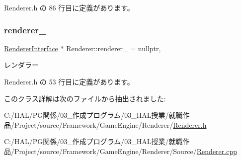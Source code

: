  Renderer.\+h の 86 行目に定義があります。

\mbox{\label{class_renderer_a64d00cd885d84ff355228d884c0215dc}} 
\subsubsection{\texorpdfstring{renderer\+\_\+}{renderer\_}}
{\footnotesize\ttfamily \mbox{\hyperlink{class_renderer_interface}{Renderer\+Interface}} $\ast$ Renderer\+::renderer\+\_\+ = nullptr\hspace{0.3cm}{\ttfamily [static]}, {\ttfamily [private]}}



レンダラー 



 Renderer.\+h の 53 行目に定義があります。



このクラス詳解は次のファイルから抽出されました\+:\begin{DoxyCompactItemize}
\item 
C\+:/\+H\+A\+L/\+P\+G関係/03\+\_\+作成プログラム/03\+\_\+\+H\+A\+L授業/就職作品/\+Project/source/\+Framework/\+Game\+Engine/\+Renderer/\mbox{\hyperlink{_renderer_8h}{Renderer.\+h}}\item 
C\+:/\+H\+A\+L/\+P\+G関係/03\+\_\+作成プログラム/03\+\_\+\+H\+A\+L授業/就職作品/\+Project/source/\+Framework/\+Game\+Engine/\+Renderer/\+Source/\mbox{\hyperlink{_renderer_8cpp}{Renderer.\+cpp}}\end{DoxyCompactItemize}
